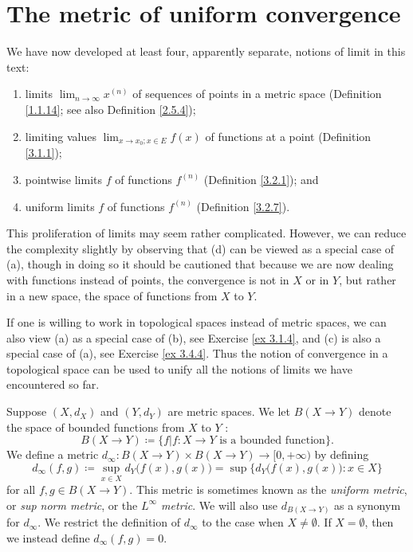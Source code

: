 \section{The metric of uniform convergence}\label{sec 3.4}

\begin{note}
    We have now developed at least four, apparently separate, notions of limit in this text:
    \begin{enumerate}
        \item limits \(\lim_{n \to \infty} x^{(n)}\) of sequences of points in a metric space
              (Definition \ref{1.1.14};
              see also Definition \ref{2.5.4});
        \item limiting values \(\lim_{x \to x_0 ; x \in E} f(x)\) of functions at a point
              (Definition \ref{3.1.1});
        \item pointwise limits \(f\) of functions \(f^{(n)}\)
              (Definition \ref{3.2.1});
              and
        \item uniform limits \(f\) of functions \(f^{(n)}\)
              (Definition \ref{3.2.7}).
    \end{enumerate}

    This proliferation of limits may seem rather complicated.
    However, we can reduce the complexity slightly by observing that (d) can be viewed as a special case of (a), though in doing so it should be cautioned that because we are now dealing with functions instead of points, the convergence is not in \(X\) or in \(Y\), but rather in a new space, the space of functions from \(X\) to \(Y\).
\end{note}

\begin{remark}\label{3.4.1}
    If one is willing to work in topological spaces instead of metric spaces, we can also view (a) as a special case of (b), see Exercise \ref{ex 3.1.4}, and (c) is also a special case of (a), see Exercise \ref{ex 3.4.4}.
    Thus the notion of convergence in a topological space can be used to unify all the notions of limits we have encountered so far.
\end{remark}

\begin{definition}\label{3.4.2}
    Suppose \((X, d_X)\) and \((Y, d_Y)\) are metric spaces.
    We let \(B(X \to Y)\) denote the space of bounded functions from \(X\) to \(Y\) :
    \[
        B(X \to Y) \coloneqq \{f | f : X \to Y \text{ is a bounded function}\}.
    \]
    We define a metric \(d_\infty : B(X \to Y) \times B(X \to Y) \to [0, +\infty)\) by defining
    \[
        d_\infty(f, g) \coloneqq \sup_{x \in X} d_Y\big(f(x), g(x)\big) = \sup\Big\{d_Y\big(f(x), g(x)\big) : x \in X\Big\}
    \]
    for all \(f, g \in B(X \to Y)\).
    This metric is sometimes known as the \emph{uniform metric}, or \emph{sup norm metric}, or the \emph{\(L^\infty\) metric}.
    We will also use \(d_{B(X \to Y)}\) as a synonym for \(d_\infty\).
    We restrict the definition of \(d_\infty\) to the case when \(X \neq \emptyset\).
    If \(X = \emptyset\), then we instead define \(d_\infty(f, g) = 0\).
\end{definition}

